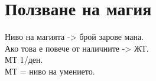 \section{Ползване на магия}
Ниво на магията -> брой зарове мана.  \\
Ако това е повече от наличните -> ЖТ. \\
МТ 1/ден.                             \\
МТ = ниво на умението.                \\
